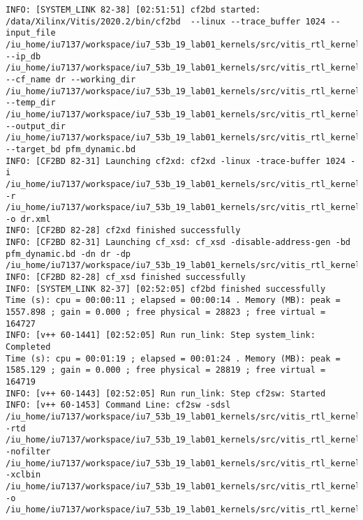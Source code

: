 \begin{center}
\begin{lstlisting}[label=lst:vlog,caption=Файл v++\_vinc.log]
INFO: [SYSTEM_LINK 82-38] [02:51:51] cf2bd started: /data/Xilinx/Vitis/2020.2/bin/cf2bd  --linux --trace_buffer 1024 --input_file /iu_home/iu7137/workspace/iu7_53b_19_lab01_kernels/src/vitis_rtl_kernel/rtl_kernel_wizard_1/_x/link/sys_link/cfgraph/cfgen_cfgraph.xml --ip_db /iu_home/iu7137/workspace/iu7_53b_19_lab01_kernels/src/vitis_rtl_kernel/rtl_kernel_wizard_1/_x/link/sys_link/_sysl/.cdb/xd_ip_db.xml --cf_name dr --working_dir /iu_home/iu7137/workspace/iu7_53b_19_lab01_kernels/src/vitis_rtl_kernel/rtl_kernel_wizard_1/_x/link/sys_link/_sysl/.xsd --temp_dir /iu_home/iu7137/workspace/iu7_53b_19_lab01_kernels/src/vitis_rtl_kernel/rtl_kernel_wizard_1/_x/link/sys_link --output_dir /iu_home/iu7137/workspace/iu7_53b_19_lab01_kernels/src/vitis_rtl_kernel/rtl_kernel_wizard_1/_x/link/int --target_bd pfm_dynamic.bd
INFO: [CF2BD 82-31] Launching cf2xd: cf2xd -linux -trace-buffer 1024 -i /iu_home/iu7137/workspace/iu7_53b_19_lab01_kernels/src/vitis_rtl_kernel/rtl_kernel_wizard_1/_x/link/sys_link/cfgraph/cfgen_cfgraph.xml -r /iu_home/iu7137/workspace/iu7_53b_19_lab01_kernels/src/vitis_rtl_kernel/rtl_kernel_wizard_1/_x/link/sys_link/_sysl/.cdb/xd_ip_db.xml -o dr.xml
INFO: [CF2BD 82-28] cf2xd finished successfully
INFO: [CF2BD 82-31] Launching cf_xsd: cf_xsd -disable-address-gen -bd pfm_dynamic.bd -dn dr -dp /iu_home/iu7137/workspace/iu7_53b_19_lab01_kernels/src/vitis_rtl_kernel/rtl_kernel_wizard_1/_x/link/sys_link/_sysl/.xsd
INFO: [CF2BD 82-28] cf_xsd finished successfully
INFO: [SYSTEM_LINK 82-37] [02:52:05] cf2bd finished successfully
Time (s): cpu = 00:00:11 ; elapsed = 00:00:14 . Memory (MB): peak = 1557.898 ; gain = 0.000 ; free physical = 28823 ; free virtual = 164727
INFO: [v++ 60-1441] [02:52:05] Run run_link: Step system_link: Completed
Time (s): cpu = 00:01:19 ; elapsed = 00:01:24 . Memory (MB): peak = 1585.129 ; gain = 0.000 ; free physical = 28819 ; free virtual = 164719
INFO: [v++ 60-1443] [02:52:05] Run run_link: Step cf2sw: Started
INFO: [v++ 60-1453] Command Line: cf2sw -sdsl /iu_home/iu7137/workspace/iu7_53b_19_lab01_kernels/src/vitis_rtl_kernel/rtl_kernel_wizard_1/_x/link/int/sdsl.dat -rtd /iu_home/iu7137/workspace/iu7_53b_19_lab01_kernels/src/vitis_rtl_kernel/rtl_kernel_wizard_1/_x/link/int/cf2sw.rtd -nofilter /iu_home/iu7137/workspace/iu7_53b_19_lab01_kernels/src/vitis_rtl_kernel/rtl_kernel_wizard_1/_x/link/int/cf2sw_full.rtd -xclbin /iu_home/iu7137/workspace/iu7_53b_19_lab01_kernels/src/vitis_rtl_kernel/rtl_kernel_wizard_1/_x/link/int/xclbin_orig.xml -o /iu_home/iu7137/workspace/iu7_53b_19_lab01_kernels/src/vitis_rtl_kernel/rtl_kernel_wizard_1/_x/link/int/xclbin_orig.1.xml

\end{lstlisting}
\end{center}
